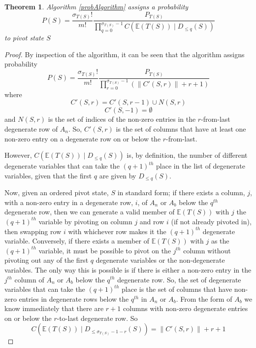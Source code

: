 \documentclass{article}
\newtheorem{theorem}{Theorem}
\begin{document}
\begin{theorem}
	Algorithm \ref{probAlgorithm} assigns a probability
	\[
	P(S) =  \frac{\sigma_{T(S)}!}{m!} \frac{P_{T(S)}}{\prod_{q=0}^{\sigma_{T(S)}-1} C(\mathbb{E}(T(S)) \mid D_{\le q}(S))}
	\]
	to pivot state $S$
\end{theorem}
\begin{proof}
	By inspection of the algorithm, it can be seen that the algorithm assigns probability 
	\[
	P(S) =  \frac{\sigma_{T(S)}!}{m!} \frac{P_{T(S)}}{\prod_{r=0}^{\sigma_{T(S)}-1} \left(\left\|C'(S, r)\right\| + r + 1\right)}
	\]
	where
	\[
	C'(S,r) = C'(S,r-1) \cup N(S,r)
	\]
	\[
	C'(S,-1) = \emptyset
	\]
	and $N(S,r)$ is the set of indices of the non-zero entries in the $r$-from-last degenerate row of $A_n$. So, $C'(S,r)$ is the set of columns that have at least one non-zero entry on a degenerate row on or below the $r$-from-last.
	
	However, $C(\mathbb{E}(T(S)) \mid D_{\le q}(S))$ is, by definition, the number of different degenerate variables that can take the $(q+1)^{th}$ place in the list of degenerate variables, given that the first $q$ are given by $D_{\le q}(S)$.
	
	Now, given an ordered pivot state, $S$ in standard form; if there exists a column, $j$, with a non-zero entry in a degenerate row, $i$,  of $A_n$ or $A_b$ below the $q^{th}$ degenerate row, then we can generate a valid member of $\mathbb{E}(T(S))$ with $j$ the $(q+1)^{th}$ variable by pivoting on column $j$ and row $i$ (if not already pivoted in), then swapping row $i$ with whichever row makes it the $(q+1)^{th}$ degenerate variable. Conversely, if there exists a member of $\mathbb{E}(T(S))$ with $j$ as the $(q+1)^{th}$ variable, it must be possible to pivot on the $j^{th}$ column without pivoting out any of the first $q$ degenerate variables or the non-degenerate variables. The only way this is possible is if there is either a non-zero entry in the $j^{th}$ column of $A_n$ or $A_b$ below the $q^{th}$ degenerate row. So, the set of degenerate variables that can take the $(q+1)^{th}$ place is the set of columns that have non-zero entries in degenerate rows below the $q^{th}$ in $A_n$ or $A_b$. From the form of $A_b$ we know immediately that there are $r+1$ columns with non-zero degenerate entries on or below the $r$-to-last degenerate row. So
	\[
	C(\mathbb{E}(T(S)) \mid D_{\le \sigma_{T(S)} -1 - r}(S)) = \left\|C'(S, r)\right\| + r + 1
	\]
	
	
\end{proof}
\end{document}
